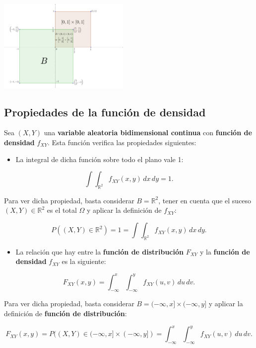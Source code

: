 \documentclass[
  letterpaper,
  DIV=11,
  numbers=noendperiod]{scrreprt}
\providecommand{\tightlist}{%
  \setlength{\itemsep}{0pt}\setlength{\parskip}{0pt}}\usepackage{longtable,booktabs,array}
\begin{document}
\includegraphics[width=2.5in,height=\textheight]{Images/VaUniformeBidi.png}

\hypertarget{propiedades-de-la-funciuxf3n-de-densidad}{%
\subsection{Propiedades de la función de
densidad}\label{propiedades-de-la-funciuxf3n-de-densidad}}

Sea \((X,Y)\) una \textbf{variable aleatoria bidimensional continua} con
\textbf{función de densidad} \(f_{XY}\). Esta función verifica las
propiedades siguientes:

\begin{itemize}
\tightlist
\item
  La integral de dicha función sobre todo el plano vale 1:
\end{itemize}

\[
\int\int_{\mathbb{R}^2} f_{XY}(x,y)\,dx\,dy =1.
\]

Para ver dicha propiedad, basta considerar \(B=\mathbb{R}^2\), tener en
cuenta que el suceso \((X,Y)\in \mathbb{R}^2\) es el total \(\Omega\) y
aplicar la definición de \(f_{XY}\):

\[
P((X,Y)\in \mathbb{R}^2)=1= \int\int_{\mathbb{R}^2} f_{XY}(x,y)\,dx\,dy.
\]

\begin{itemize}
\tightlist
\item
  La relación que hay entre la \textbf{función de distribución}
  \(F_{XY}\) y la \textbf{función de densidad} \(f_{XY}\) es la
  siguiente:
\end{itemize}

\[
F_{XY}(x,y)=\int_{-\infty}^x\int_{-\infty}^y f_{XY}(u,v)\,du\,dv.
\]

Para ver dicha propiedad, basta considerar
\(B=(-\infty,x]\times (-\infty,y]\) y aplicar la definición de
\textbf{función de distribución}:

\[
F_{XY}(x,y)=P((X,Y)\in (-\infty,x]\times (-\infty,y])=\int_{-\infty}^x\int_{-\infty}^y f_{XY}(u,v)\,du\,dv.
\]
\end{document}
